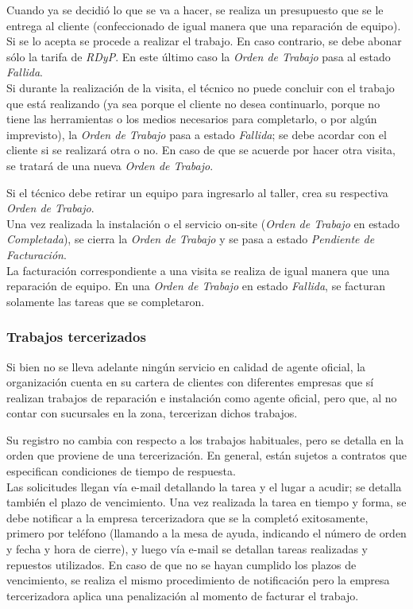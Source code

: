 \documentclass[12pt]{extarticle}
\begin{document}
\begin{spacing}{1.2}
    Cuando ya se decidió lo que se va a hacer, se realiza un presupuesto que se le entrega al cliente (confeccionado de igual manera que una reparación de equipo). Si se lo acepta se procede a realizar el trabajo. En caso contrario, se debe abonar sólo la tarifa de \textit{RDyP}. En este último caso la \textit{Orden de Trabajo} pasa al estado \textit{Fallida}.\\

    Si durante la realización de la visita, el técnico no puede concluir con el trabajo que está realizando (ya sea porque el cliente no desea continuarlo, porque no tiene las herramientas o los medios necesarios para completarlo, o por algún imprevisto), la \textit{Orden de Trabajo} pasa a estado \textit{Fallida}; se debe acordar con el cliente si se realizará otra o no. En caso de que se acuerde por hacer otra visita, se tratará de una nueva \textit{Orden de Trabajo}.
    
    Si el técnico debe retirar un equipo para ingresarlo al taller, crea su respectiva \textit{Orden de Trabajo}.\\

    Una vez realizada la instalación o el servicio on-site (\textit{Orden de Trabajo} en estado \textit{Completada}), se cierra la \textit{Orden de Trabajo} y se pasa a estado \textit{Pendiente de Facturación}.\\

    La facturación correspondiente a una visita se realiza de igual manera que una reparación de equipo. En una \textit{Orden de Trabajo} en estado \textit{Fallida}, se facturan solamente las tareas que se completaron.

    \subsubsection{Trabajos tercerizados}
    Si bien no se lleva adelante ningún servicio en calidad de agente oficial, la organización cuenta en su cartera de clientes con diferentes empresas que sí realizan trabajos de reparación e instalación como agente oficial, pero que, al no contar con sucursales en la zona, tercerizan dichos trabajos.

    Su registro no cambia con respecto a los trabajos habituales, pero se detalla en la orden que proviene de una tercerización.
    En general, están sujetos a contratos que especifican condiciones de tiempo de respuesta.\\

    Las solicitudes llegan vía e-mail detallando la tarea y el lugar a acudir; se detalla también el plazo de vencimiento.
    Una vez realizada la tarea en tiempo y forma, se debe notificar a la empresa tercerizadora que se la completó exitosamente, primero por teléfono (llamando a la mesa de ayuda, indicando el número de orden y fecha y hora de cierre), y luego vía e-mail se detallan tareas realizadas y repuestos utilizados.
    En caso de que no se hayan cumplido los plazos de vencimiento, se realiza el mismo procedimiento de notificación pero la empresa tercerizadora aplica una penalización al momento de facturar el trabajo.


\end{spacing}
\end{document}
